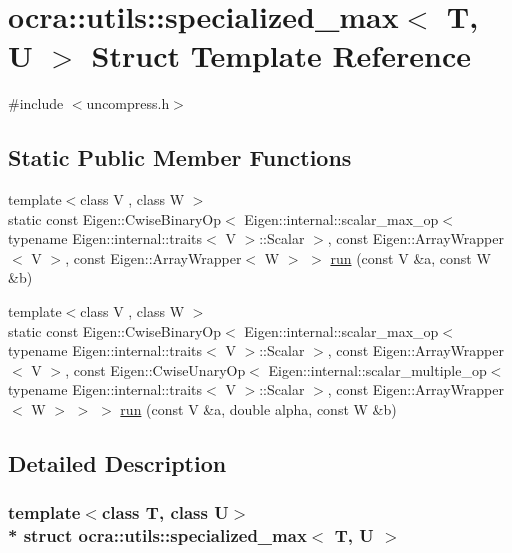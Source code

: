 \hypertarget{structocra_1_1utils_1_1specialized__max}{}\section{ocra\+:\+:utils\+:\+:specialized\+\_\+max$<$ T, U $>$ Struct Template Reference}
\label{structocra_1_1utils_1_1specialized__max}


{\ttfamily \#include $<$uncompress.\+h$>$}

\subsection*{Static Public Member Functions}
\begin{DoxyCompactItemize}
\item 
{\footnotesize template$<$class V , class W $>$ }\\static const Eigen\+::\+Cwise\+Binary\+Op$<$ Eigen\+::internal\+::scalar\+\_\+max\+\_\+op$<$ typename Eigen\+::internal\+::traits$<$ V $>$\+::Scalar $>$, const Eigen\+::\+Array\+Wrapper$<$ V $>$, const Eigen\+::\+Array\+Wrapper$<$ W $>$ $>$ \hyperlink{structocra_1_1utils_1_1specialized__max_a597099a14b8243fa865f8f461ec655d9}{run} (const V \&a, const W \&b)
\item 
{\footnotesize template$<$class V , class W $>$ }\\static const Eigen\+::\+Cwise\+Binary\+Op$<$ Eigen\+::internal\+::scalar\+\_\+max\+\_\+op$<$ typename Eigen\+::internal\+::traits$<$ V $>$\+::Scalar $>$, const Eigen\+::\+Array\+Wrapper$<$ V $>$, const Eigen\+::\+Cwise\+Unary\+Op$<$ Eigen\+::internal\+::scalar\+\_\+multiple\+\_\+op$<$ typename Eigen\+::internal\+::traits$<$ V $>$\+::Scalar $>$, const Eigen\+::\+Array\+Wrapper$<$ W $>$ $>$ $>$ \hyperlink{structocra_1_1utils_1_1specialized__max_acd525475852219cc691bfafd273ed5fb}{run} (const V \&a, double alpha, const W \&b)
\end{DoxyCompactItemize}


\subsection{Detailed Description}
\subsubsection*{template$<$class T, class U$>$\\*
struct ocra\+::utils\+::specialized\+\_\+max$<$ T, U $>$}



